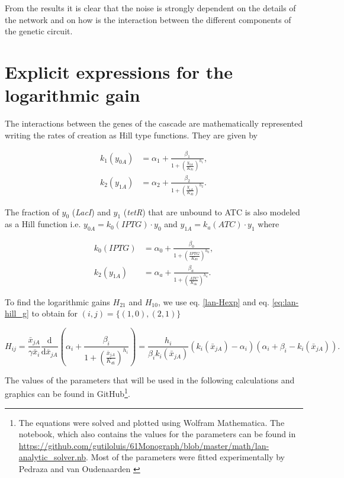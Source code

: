 From the results it is clear that the noise is strongly dependent on the details of the network and on how is the interaction between the different components of the genetic circuit.

\section{Explicit expressions for the logarithmic gain}

The interactions between the genes of the cascade are mathematically represented writing the rates of creation as Hill type functions. They are given by

\begin{equation}
  \label{eq:lan-hill_g}
  \begin{split}
    k_1(y_{0A}) &= \alpha_1 + \frac{\beta_1}{1+(\frac{y_{0A}}{K_{d1}})^{h_1}},\\
    k_2(y_{1A}) &= \alpha_2 + \frac{\beta_2}{1+(\frac{y_{1A}}{K_{d2}})^{h_2}}.
\end{split}
  \end{equation}

The fraction of $y_0$ (\textit{LacI}) and $y_1$ (\textit{tetR}) that are unbound to ATC is also modeled as a Hill function i.e. $y_{0A} = k_0(IPTG)\cdot y_0$ and $y_{1A} = k_a(ATC)\cdot y_1$ where

\begin{equation}
  \begin{split}
    k_0(IPTG) &= \alpha_0 + \frac{\beta_0}{1+(\frac{IPTG}{K_{d0}})^{h_0}},\\
    k_2(y_{1A}) &= \alpha_a + \frac{\beta_a}{1+(\frac{ATC}{K_{da}})^{h_a}}.
\end{split}
  \end{equation}

To find the logarithmic gains $H_{21}$ and $H_{10}$, we use eq. \eqref{lan-Hexp} and eq. \eqref{eq:lan-hill_g} to obtain for $(i,j) = \{(1,0),(2,1)\}$

\begin{equation}
  \label{eq:lan-H_det}
  H_{ij} = \frac{\bar{x}_{jA}}{\gamma\bar{x}_i}\frac{\mathrm{d}}{\mathrm{d} \bar{x}_{jA}}\left( \alpha_i + \frac{\beta_i}{1+(\frac{\bar{x}_{jA}}{K_{di}})^{h_i}}\right) = \frac{h_i}{\beta_i k_i(\bar{x}_{jA})}\left(k_i(\bar{x}_{jA}) - \alpha_i\right) \left(\alpha_i+\beta_i-k_i(\bar{x}_{jA})\right).
\end{equation}

The values of the parameters that will be used in the following calculations and graphics can be found in GitHub\footnote{The equations were solved and plotted using Wolfram Mathematica. The notebook, which also contains the values for the parameters can be found in \url{https://github.com/gutiloluis/61Monograph/blob/master/math/lan-analytic_solver.nb}. Most of the parameters were fitted experimentally by Pedraza and van Oudenaarden \cite{pedraza05}}.

